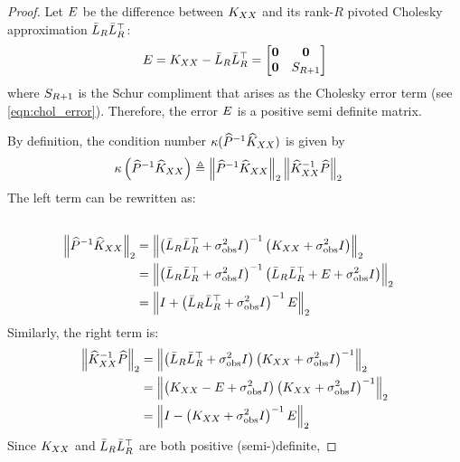 \begin{proof}
  Let $E$ be the difference between $K_{XX}$ and its rank-$R$ pivoted Cholesky approximation $\bar{L}_R \bar{L}_R^\top$:
  \[
    E = K_{XX} - \bar{L}_R \bar{L}_R^\top = \begin{bmatrix} \mathbf{0} & \mathbf{0} \\ \mathbf{0} & S_{R+1} \end{bmatrix}
  \]
  where $S_{R+1}$ is the Schur compliment that arises as the Cholesky error term (see \cref{eqn:chol_error}).
  Therefore, the error $E$ is a positive semi definite matrix.

  By definition, the condition number $\kappa ( \widehat{P}^{-1}\widehat{K}_{XX} )$ is given by
  \begin{align*}
    \kappa \left( \widehat{P}^{-1}\widehat{K}_{XX} \right)
    &\triangleq \left\Vert \widehat{P}^{-1}\widehat{K}_{XX} \right\Vert_{2} \left\Vert \widehat{K}_{XX}^{-1}\widehat{P} \right\Vert_{2}
  \end{align*}
  The left term can be rewritten as:
  \begin{align*}
    \\
    \left\Vert \widehat{P}^{-1}\widehat{K}_{XX} \right\Vert_{2}
    &= \left\Vert \left( \bar{L}_R \bar{L}_R^\top + \sigma^2_\text{obs} I \right)^{-1} \left(K_{XX} + \sigma^2_\text{obs} I \right) \right\Vert_{2}
    \\
    &= \left\Vert \left( \bar{L}_R \bar{L}_R^\top + \sigma^2_\text{obs} I \right)^{-1} \left(\bar{L}_R \bar{L}_R^\top + E + \sigma^2_\text{obs} I \right) \right\Vert_{2}
    \\
    &= \left\Vert I + \left( \bar{L}_R \bar{L}_R^\top + \sigma^2_\text{obs} I \right)^{-1} E \right\Vert_{2}
  \end{align*}
  Similarly, the right term is:
  \begin{align*}
    \left\Vert \widehat{K}_{XX}^{-1}\widehat{P} \right\Vert_{2}
    &= \left\Vert \left( \bar{L}_R \bar{L}_R^\top + \sigma^2_\text{obs} I \right) \left(K_{XX} + \sigma^2_\text{obs} I \right)^{-1} \right\Vert_{2}
    \\
    &= \left\Vert \left( K_{XX} - E + \sigma^2_\text{obs} I \right) \left(K_{XX} + \sigma^2_\text{obs} I \right)^{-1} \right\Vert_{2}
    \\
    &= \left\Vert I - \left(K_{XX} + \sigma^2_\text{obs} I \right)^{-1} E \right\Vert_{2}
  \end{align*}
  Since $K_{XX}$ and $\bar{L}_R \bar{L}_R^\top$ are both positive (semi-)definite,

\end{proof}
